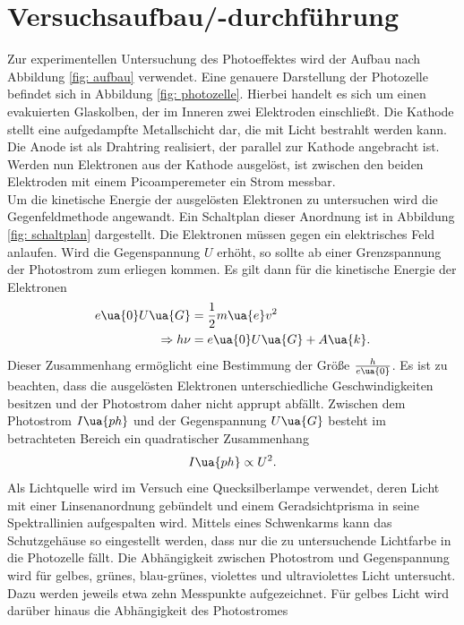 \section{Versuchsaufbau/-durchführung}
Zur experimentellen Untersuchung des Photoeffektes wird der Aufbau nach Abbildung \ref{fig: aufbau} verwendet. Eine
genauere Darstellung der Photozelle befindet sich in Abbildung \ref{fig: photozelle}. Hierbei handelt es sich um einen
evakuierten Glaskolben, der im Inneren zwei Elektroden einschließt. Die Kathode stellt eine aufgedampfte
Metallschicht dar, die mit Licht bestrahlt werden kann. Die Anode ist als Drahtring realisiert, der parallel
zur Kathode angebracht ist. Werden nun Elektronen aus der Kathode ausgelöst, ist zwischen den beiden Elektroden
mit einem Picoamperemeter ein Strom messbar. \\
Um die kinetische Energie der ausgelösten Elektronen zu untersuchen wird die Gegenfeldmethode angewandt. Ein Schaltplan
dieser Anordnung ist in Abbildung \ref{fig: schaltplan} dargestellt. Die Elektronen müssen gegen ein elektrisches Feld anlaufen.
Wird die Gegenspannung $U$ erhöht, so sollte ab einer Grenzspannung der Photostrom zum erliegen kommen. Es gilt dann
für die kinetische Energie der Elektronen
\begin{align}
\begin{aligned}
  e\ua{0} U\ua{G} &= \frac{1}{2}m\ua{e}v^2 \\
  \Rightarrow h\nu &= e\ua{0}U\ua{G} + A\ua{k}.
\end{aligned}
\end{align}
Dieser Zusammenhang ermöglicht eine Bestimmung der Größe $\frac{h}{e\ua{0}}$. Es ist zu beachten, dass
die ausgelösten Elektronen unterschiedliche Geschwindigkeiten besitzen und der Photostrom daher nicht apprupt
abfällt. Zwischen dem Photostrom $I\ua{ph}$ und der Gegenspannung $U\ua{G}$ besteht im betrachteten Bereich ein quadratischer Zusammenhang
\begin{equation}
  I\ua{ph} \propto U^2.
\end{equation}
Als Lichtquelle wird im Versuch eine Quecksilberlampe verwendet, deren Licht mit einer Linsenanordnung gebündelt
und einem Geradsichtprisma in seine Spektrallinien aufgespalten wird. Mittels eines Schwenkarms kann das Schutzgehäuse
so eingestellt werden, dass nur die zu untersuchende Lichtfarbe in die Photozelle fällt. Die Abhängigkeit zwischen
Photostrom und Gegenspannung wird für gelbes, grünes, blau-grünes, violettes und ultraviolettes Licht untersucht. Dazu
werden jeweils etwa zehn Messpunkte aufgezeichnet. Für gelbes Licht wird darüber hinaus die Abhängigkeit des Photostromes
